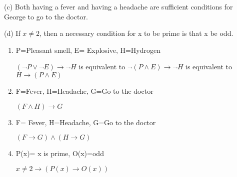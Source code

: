 \documentclass{article}
\begin{document}
(c) Both having a fever and having a headache are sufficient conditions
for George to go to the doctor.

(d) If $x \neq 2$, then a necessary condition for x to be prime is that x be odd.
\begin{enumerate}[label=(\alph*)]
    \item 
    P=Pleasant smell, E= Explosive, H=Hydrogen
    
    $(\neg P \lor \neg E)\rightarrow \neg H$ 
    is equivalent to $\neg (P \land E) \rightarrow \neg H$ is equivalent to $H \rightarrow (P \land E)$
    \item
    F=Fever, H=Headache, G=Go to the doctor
    
    $(F\land H)\rightarrow G$
    \item
    F= Fever, H=Headache, G=Go to the doctor
    
    $(F\rightarrow G) \land (H\rightarrow G)$
    \item
    P(x)= x is prime, O(x)=odd
    
    $x \neq 2 \rightarrow(P(x) \rightarrow O(x))$
\end{enumerate}
\end{document}
